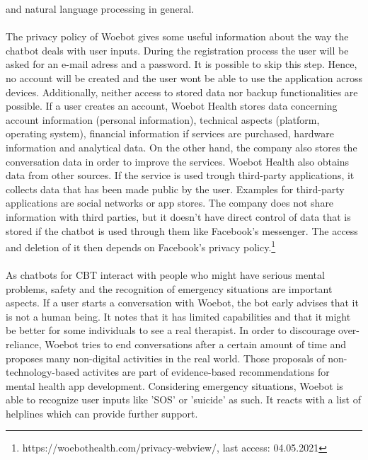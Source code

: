 \documentclass[sigconf, nonacm]{acmart}
\begin{document}
and natural language processing in general.\cite{Fitzpatrick2017}
\\\\
The privacy policy of Woebot gives some useful information about the way the chatbot deals with user inputs. 
During the registration process the user will be asked for an e-mail adress and a password. It is possible to skip
this step. Hence, no account will be created and the user wont be able to use the application across devices. 
Additionally, neither access to stored data nor backup functionalities are possible. If a user creates an account, Woebot Health stores
data concerning account information (personal information), technical aspects (platform, operating system), financial information if 
services are purchased, hardware information and analytical data. On the other hand, the company also stores the conversation data in order
to improve the services. Woebot Health also obtains data from other sources. If the service is used trough third-party applications, 
it collects data that has been made public by the user. Examples for third-party applications are social networks or app stores. 
The company does not share information with third parties, but it doesn't have direct control of data that is stored if the chatbot
is used through them like Facebook's messenger. The access and deletion of it then depends on Facebook's privacy policy.\footnote{https://woebothealth.com/privacy-webview/, last access: 04.05.2021}
\\\\
As chatbots for CBT interact with people who might have serious mental problems, safety and the recognition of emergency situations are important
aspects. If a user starts a conversation with Woebot, the bot early advises that it is not a human being. It notes that it has limited capabilities and that it might 
be better for some individuals to see a real therapist. In order to discourage over-reliance, Woebot tries to end conversations after a certain amount of time and proposes many non-digital activities in the real world.
Those proposals of non-technology-based activites are part of evidence-based recommendations for mental health app development\cite{Bakker2016}.
Considering emergency situations, Woebot is able to recognize user inputs like 'SOS' or 'suicide' as such. It reacts with a list of helplines
which can provide further support.\cite{Kretzschmar2019}
\end{document}
